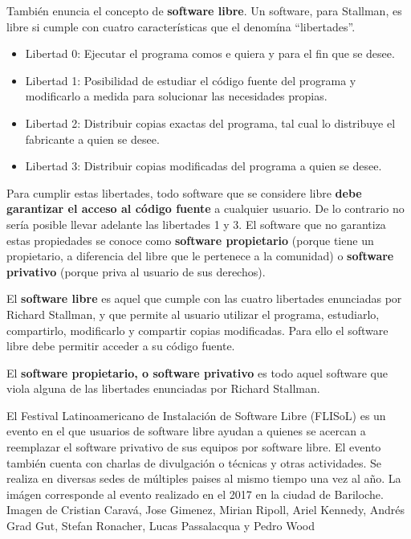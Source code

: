 También enuncia el concepto de \textbf{software libre}. Un software, para
Stallman, es libre si cumple con cuatro características que el denomína ``libertades''.
\begin{itemize}
    \item Libertad 0: Ejecutar el programa comos e quiera y para el fin que se desee.
    \item Libertad 1: Posibilidad de estudiar el código fuente del programa y modificarlo a medida para solucionar las necesidades propias.
    \item Libertad 2: Distribuir copias exactas del programa, tal cual lo distribuye el fabricante a quien se desee.
    \item Libertad 3: Distribuir copias modificadas del programa a quien se desee.
\end{itemize}

Para cumplir estas libertades, todo software que se considere libre \textbf{debe
garantizar el acceso al código fuente} a cualquier usuario. De lo contrario no
sería posible llevar adelante las libertades 1 y 3. El software que no garantiza
estas propiedades se conoce como \textbf{software propietario} (porque tiene
un propietario, a diferencia del libre que le pertenece a la comunidad) o
\textbf{software privativo} (porque priva al usuario de sus derechos).\autocite{stallman_2009}

\begin{definition}
    El \textbf{software libre} es aquel que cumple con las cuatro libertades
    enunciadas por Richard Stallman, y que permite al usuario utilizar el programa,
    estudiarlo, compartirlo, modificarlo y compartir copias modificadas. Para ello
    el software libre debe permitir acceder a su código fuente.
\end{definition}

\begin{definition}
    El \textbf{software propietario, o software privativo} es todo aquel
    software que viola alguna de las libertades enunciadas por Richard Stallman.
\end{definition}

{El Festival Latinoamericano de Instalación de Software Libre (FLISoL) es un
evento en el que usuarios de software libre ayudan a quienes se acercan a
reemplazar el software privativo de sus equipos por software libre. El evento
también cuenta con charlas de divulgación o técnicas y otras actividades. Se
realiza en diversas sedes de múltiples paises al mismo tiempo una vez al año.
La imágen corresponde al evento realizado en el 2017 en la ciudad de Bariloche.}
{Imagen de Cristian Caravá, Jose Gimenez, Mirian Ripoll, Ariel Kennedy, Andrés
Grad Gut, Stefan Ronacher, Lucas Passalacqua y Pedro Wood}

